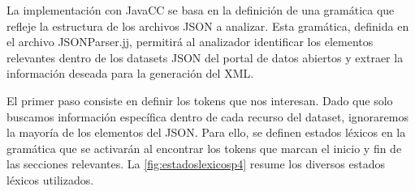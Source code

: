





\noindent La implementación con JavaCC se basa en la definición de una gramática que refleje la estructura de los archivos JSON a analizar. Esta gramática, definida en el archivo JSONParser.jj, permitirá al analizador identificar los elementos relevantes dentro de los datasets JSON del portal de datos abiertos y extraer la información deseada para la generación del XML.

El primer paso consiste en definir los tokens que nos interesan. Dado que solo buscamos información específica dentro de cada recurso del dataset, ignoraremos la mayoría de los elementos del JSON. Para ello, se definen estados léxicos en la gramática que se activarán al encontrar los tokens que marcan el inicio y fin de las secciones relevantes. La \autoref{fig:estadoslexicosp4} resume los diversos estados léxicos utilizados.

